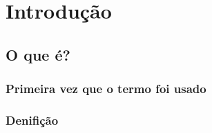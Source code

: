 \section{Introdução} 

\subsection{O que é?} %

\begin{frame}
	\frametitle{Primeira vez que o termo foi usado}

\end{frame}
\begin{frame}
	\frametitle{Denifição}

\end{frame}


